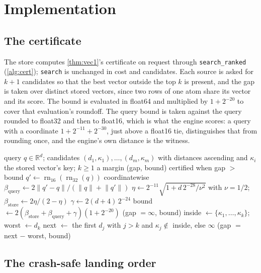 \documentclass[11pt]{article}
\theoremstyle{plain}
\theoremstyle{definition}
\theoremstyle{remark}
\newcommand{\rn}{\operatorname{rn}}
\newcommand{\norm}[1]{\lVert #1 \rVert}
\newcommand{\betaS}{\beta_{\mathrm{store}}}
\newcommand{\betaQ}{\beta_{\mathrm{query}}}
\begin{document}
\section{Implementation}

\subsection{The certificate}

The store computes \cref{thm:vec1}'s certificate on request through \texttt{search\_ranked}
(\cref{alg:cert}); \texttt{search} is unchanged in cost and candidates. Each source is asked for
$k + 1$ candidates so that the best vector outside the top $k$ is present, and the gap is taken
over distinct stored vectors, since two rows of one atom share its vector and its score. The
bound is evaluated in float64 and multiplied by $1 + 2^{-20}$ to cover that evaluation's roundoff.
The query bound is taken against the query rounded to float32 and then to float16, which is what
the engine scores: a query with a coordinate $1 + 2^{-11} + 2^{-30}$, just above a float16 tie,
distinguishes that from rounding once, and the engine's own distance is the witness.

\begin{algorithm}[htbp]
\caption{The margin certificate of a ranked read (\texttt{core/kernel/margin.py}).}\label{alg:cert}
\begin{algorithmic}[1]
\Require query $q \in \mathbb{R}^d$; candidates $(d_1, \kappa_1), \dots, (d_m, \kappa_m)$ with
distances ascending and $\kappa_i$ the stored vector's key; $k \ge 1$
\Ensure a margin (gap, bound) certified when gap $>$ bound
\State $q' \gets \rn_{16}(\rn_{32}(q))$ coordinatewise
\State $\betaQ \gets 2\norm{q' - q}/(\norm{q} + \norm{q'})$ 
\State $\eta \gets 2^{-11}\sqrt{1 + d\,2^{-28}/\nu^2}$ with $\nu = 1/2$; $\betaS \gets 2\eta/(2-\eta)$
\State $\gamma \gets 2(d + 4)\,2^{-24}$
\State bound $\gets 2(\betaS + \betaQ + \gamma)(1 + 2^{-20})$
 \Return (gap $= \infty$, bound) \EndIf
\State inside $\gets \{\kappa_1, \dots, \kappa_k\}$; worst $\gets d_k$
\State next $\gets$ the first $d_j$ with $j > k$ and $\kappa_j \notin$ inside, else $\infty$
\State \Return (gap $=$ next $-$ worst, bound)
\end{algorithmic}
\end{algorithm}

\subsection{The crash-safe landing order}
\end{document}
